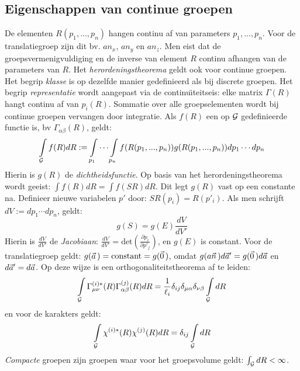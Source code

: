 \documentclass[twoside]{report}
\begin{document}
\subsection{Eigenschappen van continue groepen}
De elementen $R(p_1,...,p_n)$ hangen continu af van parameters $p_1,...,p_n$.
Voor de translatiegroep zijn dit bv. $an_x$, $an_y$ en $an_z$. Men eist dat
de groepsvermenigvuldiging en de inverse van element $R$ continu afhangen van
de parameters van $R$.
\npar
Het {\it herordeningstheorema} geldt ook voor continue groepen. Het begrip
{\it klasse} is op dezelfde manier gedefinieerd als bij discrete groepen.
Het begrip {\it representatie} wordt aangepast via de continu\"{\i}teitseis: elke
matrix $\Gamma(R)$ hangt continu af van $p_i(R)$.
\npar
Sommatie over alle groepselementen wordt bij continue groepen vervangen door
integratie. Als $f(R)$ een op ${\cal{G}}$ gedefinieerde functie is, bv $\Gamma_{\alpha\beta}(R)$,
geldt:
\[
\int\limits_{{\cal{G}}}f(R)dR:=\int\limits_{p_1}\cdots\int\limits_{p_n}
f(R(p_1,...,p_n))g(R(p_1,...,p_n))dp_1\cdots dp_n
\]
Hierin is $g(R)$ de {\it dichtheidsfunctie}.
\npar
Op basis van het herordeningstheorema wordt geeist: $\int f(R)dR=\int f(SR)dR$.
Dit legt $g(R)$ vast op een constante na. Definieer nieuwe variabelen $p'$
door: $SR(p_i)=R(p'_i)$. Als men schrijft $dV:=dp_1\cdots dp_n$, geldt:
\[
g(S)=g(E)\frac{dV}{dV'}
\]
Hierin is $\displaystyle\frac{dV}{dV'}$ de {\it Jacobiaan}:
$\displaystyle \frac{dV}{dV'}=\mbox{det}\left(\frac{\partial p_i}{\partial p'_j}\right)$,
en $g(E)$ is constant.
\npar
Voor de translatiegroep geldt: $g(\vec{a}\,)=\mbox{constant}=g(\vec{0}\,)$,
omdat $g(a\vec{n}\,)d\vec{a}'=g(\vec{0}\,)d\vec{a}$ en $d\vec{a}'=d\vec{a}$.
\npar
Op deze wijze is een orthogonaliteitstheorema af te leiden:
\[
\int\limits_{{\cal{G}}}\Gamma^{(i)*}_{\mu\nu}(R)\Gamma^{(j)}_{\alpha\beta}(R)dR=
\frac{1}{\ell_i}\delta_{ij}\delta_{\mu\alpha}\delta_{\nu\beta}\int\limits_{{\cal{G}}}dR
\]
en voor de karakters geldt:
\[
\int\limits_{{\cal{G}}}\chi^{(i)*}(R)\chi^{(j)}(R)dR=\delta_{ij}\int\limits_{{\cal{G}}}dR
\]
{\it Compacte} groepen zijn groepen waar voor het groepsvolume geldt:
$\int_{{\cal{G}}}dR<\infty$.
\end{document}
